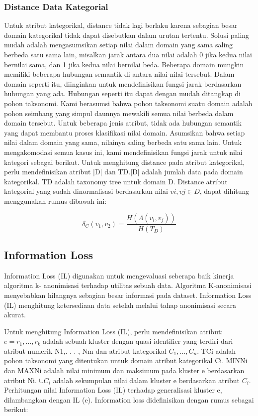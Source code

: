 \subsubsection{Distance Data Kategorial}
Untuk atribut kategorikal, distance tidak lagi berlaku karena sebagian besar domain kategorikal tidak dapat disebutkan dalam urutan tertentu. Solusi paling mudah adalah mengasumsikan setiap nilai dalam domain yang sama saling berbeda satu sama lain, misalkan jarak antara dua nilai adalah 0 jika kedua nilai bernilai sama, dan 1 jika kedua nilai bernilai beda. Beberapa domain mungkin memiliki beberapa hubungan semantik di antara nilai-nilai tersebut. Dalam domain seperti itu, diinginkan untuk mendefinisikan fungsi jarak berdasarkan hubungan yang ada. Hubungan seperti itu dapat dengan mudah ditangkap di pohon taksonomi. Kami berasumsi bahwa pohon taksonomi suatu domain adalah pohon seimbang yang simpul daunnya mewakili semua nilai berbeda dalam domain tersebut. Untuk beberapa jenis atribut, tidak ada hubungan semantik yang dapat membantu proses klasifikasi nilai domain. Asumsikan bahwa setiap nilai dalam domain yang sama, nilainya saling berbeda satu sama lain. Untuk mengakomodasi semua kasus ini, kami mendefinisikan fungsi jarak untuk nilai kategori sebagai berikut. Untuk menghitung distance pada atribut kategorikal, perlu mendefinisikan atribut |D| dan TD.|D| adalah jumlah data pada domain kategorikal. TD adalah taxonomy tree untuk domain D. Distance atribut kategorial yang sudah dinormalisasi berdasarkan nilai $vi, vj \in D$,  dapat dihitung menggunakan rumus dibawah ini:

\begin{equation}
\delta_C(v_1,v_2) = \frac{H(\Lambda(v_i,v_j))}{H(T_D)} 
\end{equation}


\subsection{Information Loss}
Information Loss (IL) digunakan untuk mengevaluasi seberapa baik kinerja algoritma k- anonimisasi terhadap utilitas sebuah data. Algoritma K-anonimisasi menyebabkan hilangnya sebagian besar informasi pada dataset. Information Loss (IL) menghitung ketersediaan data setelah melalui tahap anonimisasi secara akurat.  

\par Untuk menghitung Information Loss (IL), perlu mendefinisikan atribut: $e = {r_1,\ldots,r_k}$ adalah sebuah kluster dengan quasi-identifier yang terdiri dari atribut numerik {N1,. . . , Nm} dan atribut kategorikal ${C_1,\ldots,C_n}$. TCi adalah pohon taksonomi yang ditentukan untuk domain atribut kategorikal Ci. MINNi dan MAXNi adalah nilai minimum dan maksimum pada kluster e berdasarkan atribut Ni. $\cup C_i$ adalah sekumpulan nilai dalam kluster e berdasarkan atribut 
$C_i$. Perhitungan nilai Information Loss (IL) terhadap generalisasi kluster e, dilambangkan dengan IL (e). Information loss didefinisikan dengan rumus sebagai berikut:

